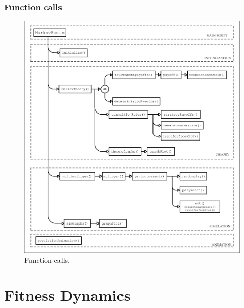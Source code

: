 \documentclass[12pt]{report}
\begin{document}
\clearpage
\subsection{Function calls}

    

\begin{figure}[h!]
    \centering
    \includegraphics[width=1.15\textwidth]{Function Calls.pdf}
    \caption{Function calls.}
\end{figure}

\chapter{Fitness Dynamics}
\end{document}
